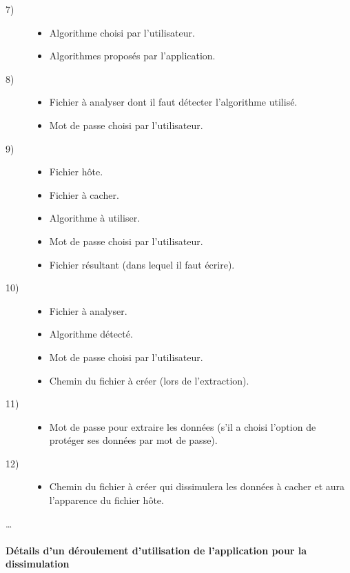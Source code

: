 \documentclass[11pt]{article}
\begin{document}
\begin{multicols}{2}
\begin{description}
\begin{itemize}
\end{itemize}
\item[7)] %
\begin{itemize}
\item Algorithme choisi par l'utilisateur. 
\item Algorithmes proposés par l'application. 
\end{itemize}
\item[8)] %
\begin{itemize}
\item Fichier à analyser dont il faut détecter l'algorithme utilisé. 
\item Mot de passe choisi par l'utilisateur. 
\end{itemize}
\item[9)] %
\begin{itemize}
\item Fichier hôte. 
\item Fichier à cacher. 
\item Algorithme à utiliser. 
\item Mot de passe choisi par l'utilisateur. 
\item Fichier résultant (dans lequel il faut écrire). 
\end{itemize}
\item[10)] %
\begin{itemize}
\item Fichier à analyser.
\item Algorithme détecté. 
\item Mot de passe choisi par l'utilisateur. 
\item Chemin du fichier à créer (lors de l'extraction). 
\end{itemize}
\item[11)] 
\begin{itemize}
\item Mot de passe pour extraire les données (s'il a choisi l'option de
    protéger ses données par mot de passe).
\end{itemize}
\item[12)]
\begin{itemize}
\item Chemin du fichier à créer qui dissimulera les données à cacher et aura
    l'apparence du fichier hôte.
\end{itemize}
\end{description}
  \ldots
\end{multicols}

\paragraph{Détails d'un déroulement d'utilisation de l'application pour la 
dissimulation}
\end{document}
